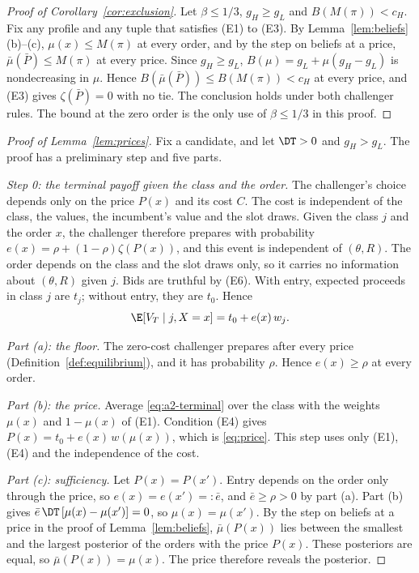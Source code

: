\begin{proof}[Proof of Corollary~\ref{cor:exclusion}]
Let \(\beta\le1/3\), \(g_H\ge g_L\) and \(B(M(\pi))<c_H\). Fix any profile and any tuple that satisfies (E1) to
(E3). By Lemma~\ref{lem:beliefs}(b)--(c), \(\mu(x)\le M(\pi)\) at every order, and by the step on beliefs at a price,
\(\bar\mu(\bar P)\le M(\pi)\) at every price. Since \(g_H\ge g_L\), \(B(\mu)=g_L+\mu(g_H-g_L)\) is nondecreasing in
\(\mu\). Hence \(B(\bar\mu(\bar P))\le B(M(\pi))<c_H\) at every price, and (E3) gives \(\zeta(\bar P)=0\) with no
tie. The conclusion holds under both challenger rules. The bound at the zero order is the only use of
\(\beta\le1/3\) in this proof.
\end{proof}

\begin{proof}[Proof of Lemma~\ref{lem:prices}]
Fix a candidate, and let \(\DT>0\) and \(g_H>g_L\). The proof has a preliminary step and five parts.

\emph{Step 0: the terminal payoff given the class and the order.} The challenger's choice depends only on the
price \(P(x)\) and its cost \(C\). The cost is independent of the class, the values, the incumbent's value and the
slot draws. Given the class \(j\) and the order \(x\), the challenger therefore prepares with probability
\(e(x)=\rho+(1-\rho)\zeta(P(x))\), and this event is independent of \((\theta,R)\). The order depends on the class
and the slot draws only, so it carries no information about \((\theta,R)\) given \(j\). Bids are truthful by (E6).
With entry, expected proceeds in class \(j\) are \(t_j\); without entry, they are \(t_0\). Hence
\begin{equation}\label{eq:a2-terminal}
\E[V_T\mid j,X=x]=t_0+e(x)\,w_j .
\end{equation}

\emph{Part (a): the floor.} The zero-cost challenger prepares after every price (Definition~\ref{def:equilibrium}),
and it has probability \(\rho\). Hence \(e(x)\ge\rho\) at every order.

\emph{Part (b): the price.} Average \eqref{eq:a2-terminal} over the class with the weights \(\mu(x)\) and
\(1-\mu(x)\) of (E1). Condition (E4) gives \(P(x)=t_0+e(x)\,w(\mu(x))\), which is \eqref{eq:price}. This step uses
only (E1), (E4) and the independence of the cost.

\emph{Part (c): sufficiency.} Let \(P(x)=P(x')\). Entry depends on the order only through the price, so
\(e(x)=e(x')=:\bar e\), and \(\bar e\ge\rho>0\) by part (a). Part (b) gives \(\bar e\,\DT\,[\mu(x)-\mu(x')]=0\), so
\(\mu(x)=\mu(x')\). By the step on beliefs at a price in the proof of Lemma~\ref{lem:beliefs}, \(\bar\mu(P(x))\)
lies between the smallest and the largest posterior of the orders with the price \(P(x)\). These posteriors are
equal, so \(\bar\mu(P(x))=\mu(x)\). The price therefore reveals the posterior.


\end{proof}
